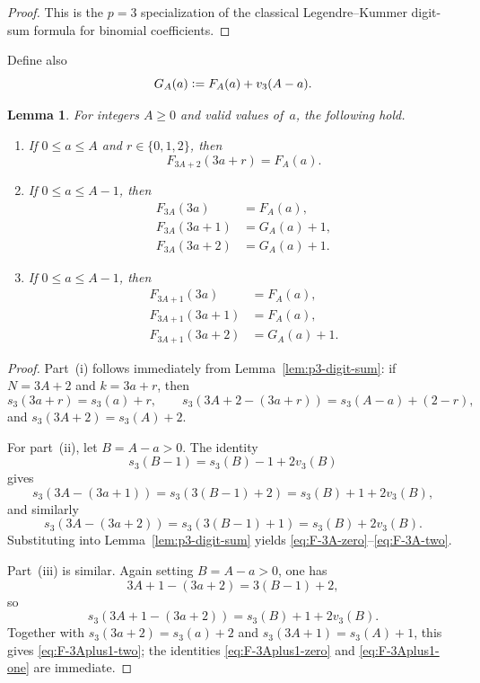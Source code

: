 \documentclass[10pt]{amsart}
\newtheorem{lemma}[theorem]{Lemma}
\theoremstyle{definition}
\theoremstyle{remark}
\newcommand{\defeq}{\vcentcolon=}
\begin{document}
\begin{proof}
This is the $p=3$ specialization of the classical Legendre--Kummer
digit-sum formula for binomial coefficients.
\end{proof}

Define also
\[
G_A(a) \defeq F_A(a)+v_3(A-a).
\]

\begin{lemma}\label{lem:p3-F-recursions}
For integers $A \ge 0$ and valid values of~$a$, the following hold.
\begin{enumerate}[label=\textup{(\roman*)}]
\item If $0 \le a \le A$ and $r \in \{0,1,2\}$, then
\begin{equation}\label{eq:F-3Aplus2}
F_{3A+2}(3a+r)=F_A(a).
\end{equation}
\item If $0 \le a \le A-1$, then
\begin{align}
F_{3A}(3a) &= F_A(a),\label{eq:F-3A-zero}\\
F_{3A}(3a+1) &= G_A(a)+1,\label{eq:F-3A-one}\\
F_{3A}(3a+2) &= G_A(a)+1.\label{eq:F-3A-two}
\end{align}
\item If $0 \le a \le A-1$, then
\begin{align}
F_{3A+1}(3a) &= F_A(a),\label{eq:F-3Aplus1-zero}\\
F_{3A+1}(3a+1) &= F_A(a),\label{eq:F-3Aplus1-one}\\
F_{3A+1}(3a+2) &= G_A(a)+1.\label{eq:F-3Aplus1-two}
\end{align}
\end{enumerate}
\end{lemma}

\begin{proof}
Part~(i) follows immediately from Lemma~\ref{lem:p3-digit-sum}: if
$N=3A+2$ and $k=3a+r$, then
\[
s_3(3a+r)=s_3(a)+r,\qquad
s_3(3A+2-(3a+r))=s_3(A-a)+(2-r),
\]
and $s_3(3A+2)=s_3(A)+2$.

For part~(ii), let $B=A-a>0$.  The identity
\[
s_3(B-1)=s_3(B)-1+2v_3(B)
\]
gives
\[
s_3(3A-(3a+1))=s_3(3(B-1)+2)=s_3(B)+1+2v_3(B),
\]
and similarly
\[
s_3(3A-(3a+2))=s_3(3(B-1)+1)=s_3(B)+2v_3(B).
\]
Substituting into Lemma~\ref{lem:p3-digit-sum} yields
\eqref{eq:F-3A-zero}--\eqref{eq:F-3A-two}.

Part~(iii) is similar.  Again setting $B=A-a>0$, one has
\[
3A+1-(3a+2)=3(B-1)+2,
\]
so
\[
s_3(3A+1-(3a+2))=s_3(B)+1+2v_3(B).
\]
Together with $s_3(3a+2)=s_3(a)+2$ and $s_3(3A+1)=s_3(A)+1$, this gives
\eqref{eq:F-3Aplus1-two}; the identities
\eqref{eq:F-3Aplus1-zero} and \eqref{eq:F-3Aplus1-one} are immediate.
\end{proof}
\end{document}
